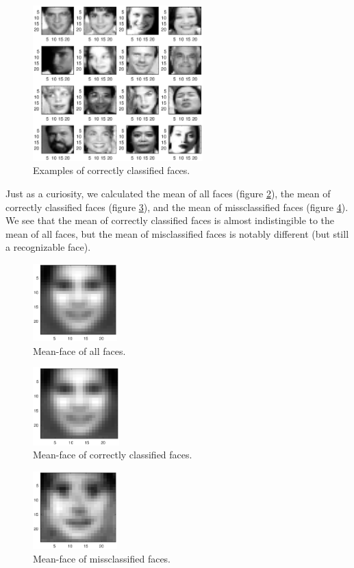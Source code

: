 \documentclass{article}
\begin{document}
\begin{figure}[h]
\centering
\includegraphics[height=6cm]{images/easy_faces}
\caption{Examples of correctly classified faces.}
\label{fig:easy_faces}
\end{figure}

Just as a curiosity, we calculated the mean of all faces (figure \ref{fig:mean_all}), the mean of correctly classified faces (figure \ref{fig:mean_correct}), and the mean of missclassified faces (figure \ref{fig:mean_miss}). We see that the mean of correctly classified faces is almost indistingible to the mean of all faces, but the mean of misclassified faces is notably different (but still a recognizable face).

\begin{figure}[h]
\centering
\includegraphics[height=3cm]{images/mean_all}
\caption{Mean-face of all faces.}
\label{fig:mean_all}
\end{figure}

\begin{figure}[h]
\centering
\includegraphics[height=3cm]{images/mean_easy}
\caption{Mean-face of correctly classified faces.}
\label{fig:mean_correct}
\end{figure}

\begin{figure}[h]
\centering
\includegraphics[height=3cm]{images/mean_hard}
\caption{Mean-face of missclassified faces.}
\label{fig:mean_miss}
\end{figure}
\end{document}
